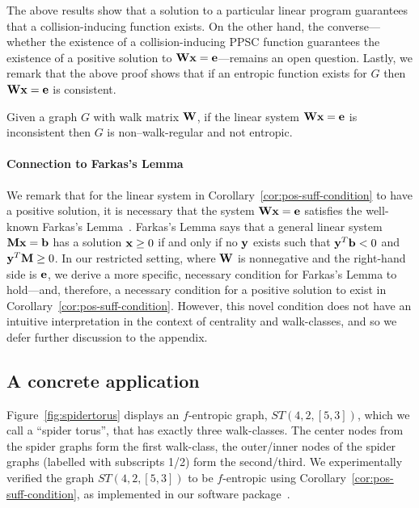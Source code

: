 The above results show that a solution to a particular linear program guarantees that a collision-inducing function exists.
On the other hand, the converse---whether the existence of a collision-inducing PPSC function guarantees the existence of a positive solution to $\textbf{W}\textbf{x}=\textbf{e}$---remains an open question.
Lastly, we remark that the above proof shows that if an entropic function exists for $G$ then $\textbf{W}\textbf{x} = \textbf{e}$ is consistent.

\begin{corollary}\label{cor:walk-class-lin-sys}
  Given a graph $G$ with walk matrix $\textbf{W}$,
  if the linear system $\textbf{W}\textbf{x} = \textbf{e}$ is inconsistent then $G$ is non--walk-regular and not entropic.
\end{corollary}

\paragraph{Connection to Farkas's Lemma}
We remark that for the linear system in Corollary~\ref{cor:pos-suff-condition} to have a positive solution, it is necessary that the system $\textbf{W}\textbf{x}=\textbf{e}$ satisfies the well-known Farkas's Lemma~\cite{Farkas1902}.
Farkas's Lemma says that a general linear system $\textbf{M}\textbf{x} = \textbf{b}$ has a solution $\textbf{x}\geq 0$ if and only if no $\textbf{y}$ exists such that $\textbf{y}^T\textbf{b} < 0$ and $\textbf{y}^T\textbf{M} \geq0$.
In our restricted setting, where $\textbf{W}$ is nonnegative and the right-hand side is $\textbf{e}$, we derive a more specific, necessary condition for Farkas's Lemma to hold---and, therefore, a necessary condition for a positive solution to exist in Corollary~\ref{cor:pos-suff-condition}.
However, this novel condition does not have an intuitive interpretation in the context of centrality and walk-classes, and so we defer further discussion to the appendix.


\subsection{A concrete application}\label{sec:spider-torus}

Figure~\ref{fig:spidertorus} displays an $f$-entropic graph, $ST(4,2,[5,3])$, which we call a ``spider torus'', that has exactly three walk-classes.
The center nodes from the spider graphs form the first walk-class, the outer/inner nodes of the spider graphs (labelled with subscripts 1/2) form the second/third. We experimentally verified the graph $ST(4,2,[5,3])$ to be $f$-entropic using Corollary~\ref{cor:pos-suff-condition}, as implemented in our software package~\cite{spiderdonuts_v1.0.0}.

